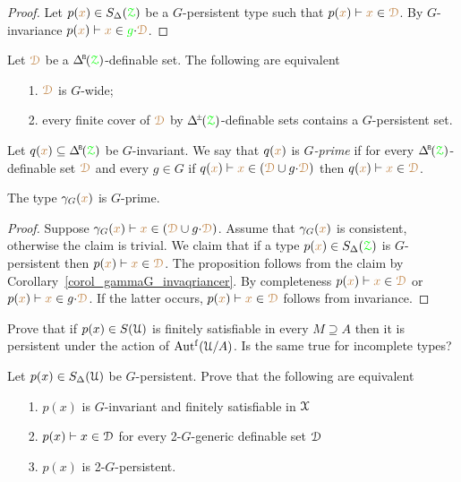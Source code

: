 \begin{proof}
  Let $p({\color{brown} x})\in S_\Delta({\color{green}\EuScript Z})$ be a $G$-persistent type such that $p({\color{brown} x})\vdash{\color{brown}x}\in{\color{brown}\EuScript D}$.
  By $G$-invariance $p({\color{brown} x})\vdash{\color{brown}x}\in{\color{green}g}{\cdot}{\color{brown}\EuScript D}$. 
\end{proof}

\begin{fact}
  Let ${\color{brown}\EuScript D}$ be a $\BDelta(\grZ)$-definable set.
  The following are equivalent
  \begin{itemize}
    \item [1.] ${\color{brown}\EuScript D}$ is $G$-wide;
    \item [2.] every finite cover of ${\color{brown}\EuScript D}$ by $\pmDelta({\grZ})$-definable sets contains a $G$-persistent set.
  \end{itemize}
\end{fact}

Let $q({\mr x})\subseteq\BDelta(\grZ)$ be $G$-invariant.
We say that $q({\color{brown} x})$ is \emph{$G$-prime\/} if for every $\BDelta(\grZ)$-definable set ${\color{brown}\EuScript D}$ and every $g\in G$ if $q({\color{brown} x})\vdash{\color{brown}x}\in({\color{brown}\EuScript D}\cup g{\cdot}{\color{brown}\EuScript D})$ then $q({\color{brown} x})\vdash{\color{brown}x}\in{\color{brown}\EuScript D}$.

\begin{proposition}
  The type $\gamma_G({\color{brown} x})$ is $G$-prime.
\end{proposition}

\begin{proof}
  Suppose $\gamma_G({\color{brown} x})\vdash{\color{brown}x}\in({\color{brown}\EuScript D}\cup g{\cdot}{\color{brown}\EuScript D})$.
  Assume that $\gamma_G({\color{brown} x})$ is consistent, otherwise the claim is trivial.
  We claim that if a type $p({\color{brown} x})\in S_\Delta({\color{green}\EuScript Z})$ is $G$-persistent then
  $p({\color{brown} x})\vdash{\color{brown}x}\in{\color{brown}\EuScript D}$.
  The proposition follows from the claim by Corollary~\ref{corol_gammaG_invaqriancer}.
  By completeness $p({\color{brown} x})\vdash{\color{brown}x}\in{\color{brown}\EuScript D}$ or $p({\color{brown} x})\vdash{\color{brown}x}\in g{\cdot}{\color{brown}\EuScript D}$.
  If the latter occurs, $p({\color{brown} x})\vdash{\color{brown}x}\in{\color{brown}\EuScript D}$ follows from invariance.
\end{proof}

\begin{exercise}
  Prove that if $p(x)\in S(\EuScript U)$ is finitely satisfiable in every $M\supseteq A$ then it is persistent under the action of $\mbox{Aut$^{\rm f}$}(\EuScript U/A)$.
  Is the same true for incomplete types?
\end{exercise}

\begin{exercise}
  Let $p(x)\in S_\Delta(\EuScript U)$ be $G$-persistent.
  Prove that the following are equivalent
  \begin{itemize}
    \item[1.] $p(x)$ is $G$-invariant and finitely satisfiable in $\EuScript X$
    \item[2.] $p(x)\vdash x\in\EuScript D$ for every 2-$G$-generic definable set $\EuScript D$
    \item[3.] $p(x)$ is 2-$G$-persistent.
  \end{itemize}
\end{exercise}

